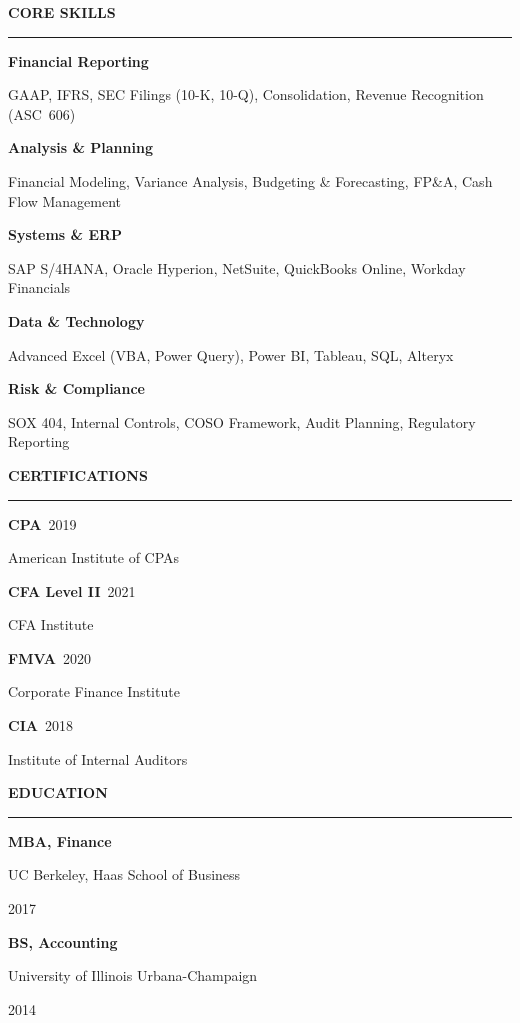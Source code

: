 \documentclass[10pt]{article}
\newcommand{\sidesection}[1]{%
  \vspace{0.6em}%
  {\color{accent}\bfseries #1}\par%
  \vspace{0.1em}%
  \textcolor{lightrule}{\rule{\linewidth}{0.4pt}}%
  \vspace{0.3em}%
}
\newcommand{\skillrow}[2]{%
  {\color{accent}\bfseries\footnotesize #1}%
  \par\vspace{0.02em}%
  {\footnotesize #2}%
  \vspace{0.35em}\par%
}
\begin{document}
\begin{minipage}[t]{0.285\textwidth}
\raggedright

\sidesection{CORE SKILLS}

\skillrow{Financial Reporting}{%
  GAAP, IFRS, SEC Filings (10-K, 10-Q), Consolidation, Revenue Recognition (ASC~606)}

\skillrow{Analysis \& Planning}{%
  Financial Modeling, Variance Analysis, Budgeting \& Forecasting, FP\&A, Cash Flow Management}

\skillrow{Systems \& ERP}{%
  SAP S/4HANA, Oracle Hyperion, NetSuite, QuickBooks Online, Workday Financials}

\skillrow{Data \& Technology}{%
  Advanced Excel (VBA, Power Query), Power BI, Tableau, SQL, Alteryx}

\skillrow{Risk \& Compliance}{%
  SOX 404, Internal Controls, COSO Framework, Audit Planning, Regulatory Reporting}

\sidesection{CERTIFICATIONS}

{\color{accent}\bfseries\footnotesize CPA}\ {\footnotesize\color{softgray}2019}\par
{\footnotesize American Institute of CPAs}\par
\vspace{0.3em}
{\color{accent}\bfseries\footnotesize CFA Level II}\ {\footnotesize\color{softgray}2021}\par
{\footnotesize CFA Institute}\par
\vspace{0.3em}
{\color{accent}\bfseries\footnotesize FMVA}\ {\footnotesize\color{softgray}2020}\par
{\footnotesize Corporate Finance Institute}\par
\vspace{0.3em}
{\color{accent}\bfseries\footnotesize CIA}\ {\footnotesize\color{softgray}2018}\par
{\footnotesize Institute of Internal Auditors}\par

\sidesection{EDUCATION}

{\bfseries\footnotesize MBA, Finance}\par
{\footnotesize\color{softgray}UC Berkeley, Haas School of Business}\par
{\footnotesize 2017}

\vspace{0.35em}
{\bfseries\footnotesize BS, Accounting}\par
{\footnotesize\color{softgray}University of Illinois Urbana-Champaign}\par
{\footnotesize 2014}

\end{minipage}%
\end{document}
